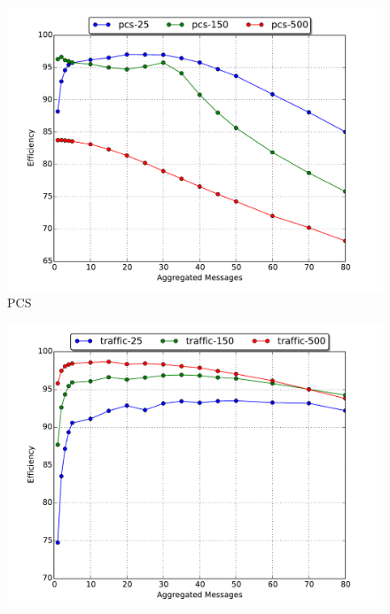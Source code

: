 \documentclass[11pt]{book}
\begin{document}
\begin{figure}
  \begin{minipage}{.5\textwidth}
    \begin{center}
      \includegraphics[width=\textwidth,keepaspectratio,quiet]{figs/partitioning_communication/aggregate_pcs_efficiency.pdf} \\
      PCS \\
    \end{center}
  \end{minipage}%
  \hfill
  \begin{minipage}{.5\textwidth}
    \begin{center}
      \includegraphics[width=\textwidth,keepaspectratio,quiet]{figs/partitioning_communication/aggregate_traffic_efficiency.pdf} \\

\end{center}
\end{minipage}
\end{figure}
\end{document}
